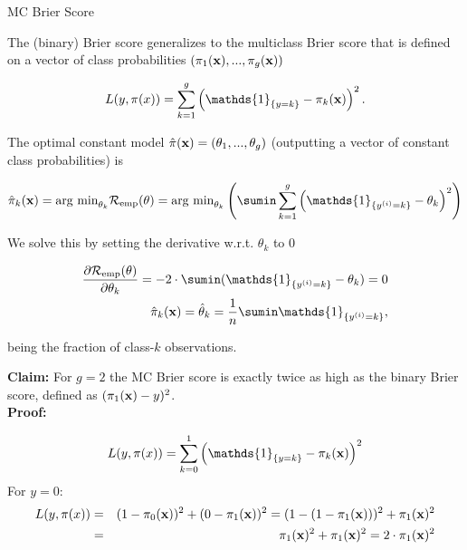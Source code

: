 \documentclass[11pt,compress,t,notes=noshow, xcolor=table]{beamer}
\begin{document}
\begin{vbframe}{MC Brier Score}

The (binary) Brier score generalizes to the multiclass Brier score that is defined on a vector of class probabilities $\left(\pi_1(\mathbf{x}), ..., \pi_g(\mathbf{x})\right)$

\begin{footnotesize}
$$
  L(y, \pi(x)) = \sum_{k = 1}^g \left(\mathds{1}_{\{y = k\}} - \pi_k(\xv)\right)^2.
$$
\end{footnotesize}

The optimal constant model $\hat \pi(\mathbf{x}) = \left(\theta_1, ..., \theta_g\right)$ (outputting a vector of constant class probabilities) is  

\vspace*{-0.5cm}
\begin{footnotesize}
  \begin{eqnarray*}
    \hat{\pi}_k(\xv) =\text{arg min}_{\theta_k} \riske(\theta) = \text{arg min}_{\theta_k} \left(\sumin \sum_{k = 1}^g \left(\mathds{1}_{\{\yi = k\}} - \theta_k\right)^2\right) 
      \end{eqnarray*}
      \end{footnotesize}
        We solve this by setting the derivative w.r.t. $\theta_k$ to 0
        \begin{footnotesize}
      \begin{eqnarray*}
      \frac{\partial \riske(\theta)}{\partial \theta_k} = - 2 \cdot \sumin (\mathds{1}_{\{\yi = k\}} - \theta_k) = 0 \\
    \pikxh = \thetah_k = \frac{1}{n} \sumin \mathds{1}_{\{\yi = k\}},   
    \end{eqnarray*}
\end{footnotesize}
being the fraction of class-$k$ observations. 

\framebreak

\textbf{Claim:} For $g = 2$ the MC Brier score is exactly twice as high as the binary Brier score, defined as $(\pi_1(\mathbf{x}) - y)^2$. \\
\lz
\textbf{Proof:}
\begin{footnotesize}
$$
  L(y, \pi(x)) = \sum_{k = 0}^1 \left(\mathds{1}_{\{y = k\}} - \pi_k(\xv)\right)^2
  $$
  For $y = 0$:
  \begin{eqnarray*}
  L(y, \pi(x)) &=& (1-\pi_0(\mathbf{x}))^2 + (0 - \pi_1(\mathbf{x}))^2  = (1-(1 - \pi_1(\mathbf{x})))^2 + \pi_1(\mathbf{x})^2 \\
  &=& \pi_1(\mathbf{x})^2 + \pi_1(\mathbf{x})^2 = 2 \cdot \pi_1(\mathbf{x})^2
  \end{eqnarray*}


\end{footnotesize}
\end{vbframe}
\end{document}
